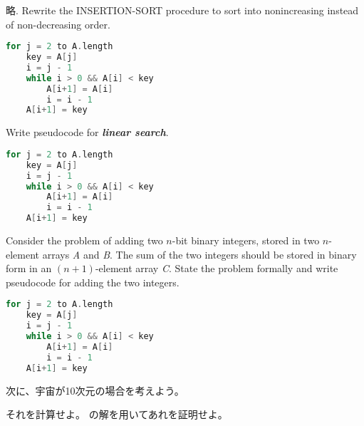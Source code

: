 \documentclass[a4paper, 12pt]{jsreport}
\begin{document}
\maketitle

\begin{qparts}
    \qpart
        \begin{qlist2}
            \qitem 略. 
            \qitem Rewrite the INSERTION-SORT procedure to sort into nonincreasing instead of non-decreasing order.
\begin{lstlisting}[caption=DESC-INSERTION-SORT(\textit{A}), label=2.1-2, language=C++]
for j = 2 to A.length
    key = A[j]
    i = j - 1
    while i > 0 && A[i] < key
        A[i+1] = A[i]
        i = i - 1
    A[i+1] = key
\end{lstlisting}
            \qitem Write pseudocode for \textit{\textbf{linear search}}. 
\begin{lstlisting}[caption=LINEAR-SEARCH(\textit{A} and $v$), label=2.1-3, language=C++]
for j = 2 to A.length
    key = A[j]
    i = j - 1
    while i > 0 && A[i] < key
        A[i+1] = A[i]
        i = i - 1
    A[i+1] = key
\end{lstlisting}
            \qitem Consider the problem of adding two $n$-bit binary integers, stored in two $n$-element arrays \textit{A} and \textit{B}. The sum of the two integers should be stored in binary form in an $(n+1)$-element array \textit{C}. State the problem formally and write pseudocode for adding the two integers. 
            \begin{lstlisting}[caption=BINARY-PLUS-OPERATOR(\textit{A} and \textit{B}), label=2.1-4, language=C++]
for j = 2 to A.length
    key = A[j]
    i = j - 1
    while i > 0 && A[i] < key
        A[i+1] = A[i]
        i = i - 1
    A[i+1] = key
\end{lstlisting}
        \end{qlist2}
    \qpart 次に、宇宙が10次元の場合を考えよう。
        \begin{qlist2}
            \qitem それを計算せよ。\label{q:10dim}
            \qitem {}の解を用いてあれを証明せよ。
        \end{qlist2}
\end{qparts}
\end{document}
